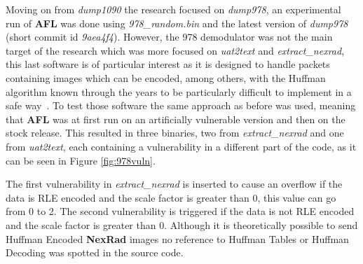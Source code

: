 \documentclass[../main.tex]{subfiles}
\begin{document}
Moving on from \textit{dump1090} the research focused on \textit{dump978}, an
experimental run of \textbf{AFL} was done using \textit{978\_random.bin} and the
latest version of \textit{dump978} (short commit id \textit{9aea4f4}). However,
the 978 demodulator was not the main target of the research which was more
focused on \textit{uat2text} and \textit{extract\_nexrad}, this last software is
of particular interest as it is designed to handle packets containing images
which can be encoded, among others, with the Huffman algorithm known through
the years to be particularly difficult to implement in a safe way~\cite{cve20176890, cve20074537}. To test those software the same approach as
before was used, meaning that \textbf{AFL} was at first run on an artificially
vulnerable version and then on the stock release. This resulted in three
binaries, two from \textit{extract\_nexrad} and one from \textit{uat2text}, each
containing a vulnerability in a different part of the code, as it can be seen in
Figure \ref{fig:978vuln}.

The first vulnerability in \textit{extract\_nexrad} is inserted to cause an
overflow if the data is RLE encoded and the scale factor is greater than 0, this
value can go from 0 to 2. The second vulnerability is triggered if the data is
not RLE encoded and the scale factor is greater than 0. Although it is
theoretically possible to send Huffman Encoded \textbf{NexRad} images no
reference to Huffman Tables or Huffman Decoding was spotted in the source code.
\end{document}
